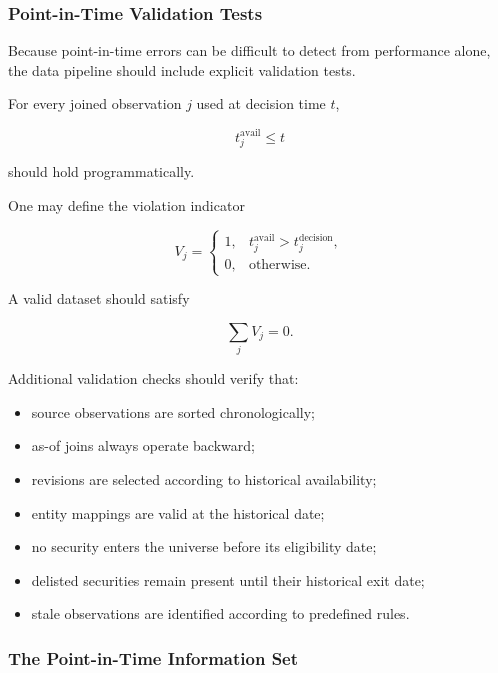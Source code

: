 \documentclass[11pt,a4paper]{article}
\begin{document}
\subsubsection{Point-in-Time Validation Tests}

Because point-in-time errors can be difficult to detect from performance alone,
the data pipeline should include explicit validation tests.

For every joined observation $j$ used at decision time $t$,

\begin{equation}
\boxed{
t_j^{\mathrm{avail}}
\leq
t
}
\end{equation}

should hold programmatically.

One may define the violation indicator

\begin{equation}
V_j
=
\begin{cases}
1,
&
t_j^{\mathrm{avail}}
>
t_j^{\mathrm{decision}},
\\
0,
&
\text{otherwise}.
\end{cases}
\end{equation}

A valid dataset should satisfy

\begin{equation}
\boxed{
\sum_j V_j
=
0.
}
\end{equation}

Additional validation checks should verify that:

\begin{itemize}
    \item source observations are sorted chronologically;
    \item as-of joins always operate backward;
    \item revisions are selected according to historical availability;
    \item entity mappings are valid at the historical date;
    \item no security enters the universe before its eligibility date;
    \item delisted securities remain present until their historical exit date;
    \item stale observations are identified according to predefined rules.
\end{itemize}


\subsubsection{The Point-in-Time Information Set}
\end{document}
